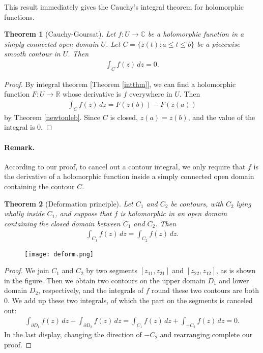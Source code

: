 \documentclass{article}
\numberwithin{equation}{section}
\newcommand{\bbC}{\mathbb{C}}
\newcommand{\bbR}{\mathbb{R}}
\theoremstyle{plain}
\newtheorem{theorem}{Theorem}[section]
\theoremstyle{definition}
\begin{document}
This result immediately gives the Cauchy's integral theorem for holomorphic functions.
\begin{theorem}[Cauchy-Goursat]\label{cauchycontourint}
Let $f:U\to\bbC$ be a holomorphic function in a simply connected open domain $U$. Let $C=\{z(t):a\leq t\leq b\}$ be a piecewise smooth contour in $U$. Then
\begin{align*}
	\int_C f(z)\,dz=0.
\end{align*}
\end{theorem}
\begin{proof}
By integral theorem [Theorem \ref{intthm}], we can find a holomorphic function $F:U\to\bbR$ whose derivative is $f$ everywhere in $U$. Then
\begin{align*}
	\int_C f(z)\,dz=F(z(b))-F(z(a))
\end{align*}
by Theorem \ref{newtonleb}. Since $C$ is closed, $z(a)=z(b)$, and the value of the integral is $0$.
\end{proof}
\paragraph{Remark.} According to our proof, to cancel out a contour integral, we only require that $f$ is the derivative of a  holomorphic function inside a simply connected open domain containing the contour $C$.

\begin{theorem}[Deformation principle]\label{deform}
Let $C_1$ and $C_2$ be contours, with $C_2$ lying wholly inside $C_1$, and suppose that $f$ is 
holomorphic in an open domain containing the closed domain between $C_1$ and $C_2$. Then 
\begin{align*}
	\int_{C_1} f(z)\,dz=\int_{C_2} f(z)\,dz.
\end{align*}
\end{theorem}
\begin{figure}[H]
	\centering
	\texttt{[image: deform.png]}
\end{figure}
\begin{proof}
We join $C_1$ and $C_2$ by two segments $[z_{11},z_{21}]$ and $[z_{22},z_{12}]$, as is shown in the figure. Then we obtain two contours on the upper domain $D_1$ and lower domain $D_2$, respectively, and the integrals of $f$ round these two contours are both $0$. We add up these two integrals, of which the part on the segments is canceled out:
\begin{align*}
	\int_{\partial D_1}f(z)\,dz+\int_{\partial D_2}f(z)\,dz=\int_{C_1}f(z)\,dz+\int_{-C_2}f(z)\,dz=0.
\end{align*}
In the last display, changing the direction of $-C_2$ and rearranging complete our proof.
\end{proof}
\end{document}
